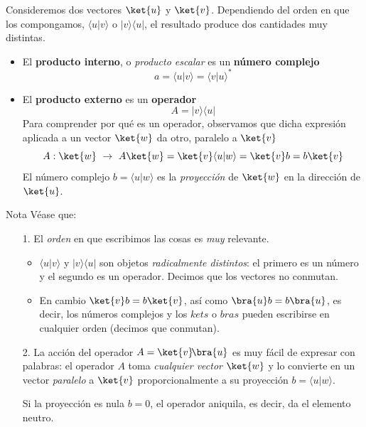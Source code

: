 \documentclass[a4paper,11pt]{book} %
\numberwithin{equation}{chapter}
\newcommand{\braket}[2]{\langle #1|#2\rangle}
\newcommand{\ketbra}[2]{| #1\rangle \! \langle #2|}
\begin{document}
Consideremos dos vectores $\ket{u}$ y $\ket{v}$. Dependiendo del orden en que los compongamos, $\braket{u}{v}$ o $\ketbra{v}{u}$, el resultado produce dos cantidades muy distintas.
\begin{itemize}
	\item El \textbf{producto interno}, o \textit{producto escalar} es un \textbf{número complejo}
\begin{equation}
 a = \braket{u}{v} = \braket{v}{u}^* 
\end{equation}

	\item El \textbf{producto externo  }es un \textbf{operador}
	\begin{equation}
	A = \ketbra{v}{u}
	\end{equation}
Para comprender por qué es un operador, observamos que dicha expresión aplicada a un vector $\ket{w}$ da otro, paralelo a $\ket{v}$
	\begin{equation}
	A : \ket{w} ~\to ~ A\ket{w} =  \ket{v}\braket{u}{w}=\ket{v} b  = b \ket{v} 
	\end{equation}
El número complejo $b=\braket{u}{w}$ es  la \textit{proyección} de $\ket{w}$ en la dirección de $\ket{u}$.
\end{itemize}

\begin{mybox_blue}{Nota}
Véase que:
\begin{itemize}
	\item[1.] El \textit{orden} en que escribimos las cosas es \textit{muy} relevante.
\vspace{0.1cm}	

	\begin{itemize}
		\item $\braket{u}{v}$ y $\ketbra{v}{u}$ son objetos \textit{radicalmente distintos}: el primero es un número y el segundo es un operador. Decimos que los vectores no conmutan.
\vspace{0.1cm}		
		
		\item En cambio $\ket{v} b  = b \ket{v}$, así como $\bra{u}b = b\bra{u}$, es decir,  los números complejos y los $kets$ o $bras$ pueden escribirse en cualquier orden (decimos que conmutan).
	\end{itemize}
	\vspace{0.2cm}
	
	\item[2.] La acción del operador  $A = \ket{v}\!\bra{u}$ es muy fácil de expresar con palabras: 
el operador $A$ toma \textit{cualquier vector} $\ket{w}$ y lo convierte en un vector \textit{paralelo} a $\ket{v}$ proporcionalmente a su proyección $b=\braket{u}{w}$. 
\vspace{0.1cm}

Si la proyección es nula $b=0$, el operador aniquila, es decir, da el elemento neutro.
\end{itemize}

\end{mybox_blue}
\end{document}
